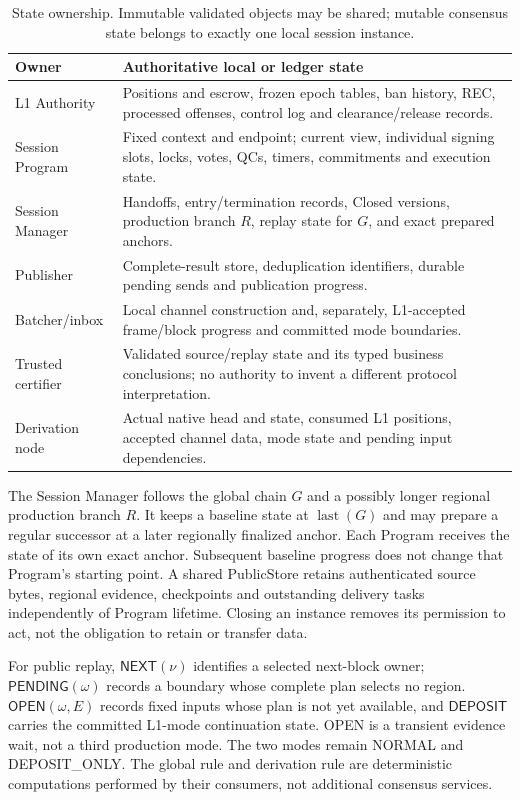 \begin{table}[htbp]
\centering\small
\caption{State ownership. Immutable validated objects may be shared;
mutable consensus state belongs to exactly one local session instance.}
\label{tab:state-ownership}
\begin{tabularx}{\linewidth}{@{}P{.21\linewidth}Y@{}}
\toprule
Owner & Authoritative local or ledger state\\\midrule
L1 Authority & Positions and escrow, frozen epoch tables, ban history,
REC, processed offenses, control log and clearance/release records.\\
Session Program & Fixed context and endpoint; current view, individual
signing slots, locks, votes, QCs, timers, commitments and execution state.\\
Session Manager & Handoffs, entry/termination records, Closed versions,
production branch $R$, replay state for $G$, and exact prepared anchors.\\
Publisher & Complete-result store, deduplication identifiers, durable
pending sends and publication progress.\\
Batcher/inbox & Local channel construction and, separately, L1-accepted
frame/block progress and committed mode boundaries.\\
Trusted certifier & Validated source/replay state and its typed business
conclusions; no authority to invent a different protocol interpretation.\\
Derivation node & Actual native head and state, consumed L1 positions,
accepted channel data, mode state and pending input dependencies.\\
\bottomrule
\end{tabularx}
\end{table}
The Session Manager follows the global chain $G$ and a possibly longer
regional production branch $R$. It keeps a baseline state at
$\operatorname{last}(G)$ and may prepare a regular successor at a later
regionally finalized anchor. Each Program receives the state of its
own exact anchor. Subsequent baseline progress does not change that
Program's starting point. A shared PublicStore retains authenticated
source bytes, regional evidence, checkpoints and outstanding delivery
tasks independently of Program lifetime. Closing an instance removes
its permission to act, not the obligation to retain or transfer data.

For public replay, $\mathsf{NEXT}(\nu)$ identifies a selected next-block
owner; $\mathsf{PENDING}(\omega)$ records a boundary whose complete plan
selects no region. $\mathsf{OPEN}(\omega,E)$ records fixed inputs whose
plan is not yet available, and $\mathsf{DEPOSIT}$ carries the committed
L1-mode continuation state. OPEN is a transient evidence wait, not a
third production mode. The two modes remain NORMAL and DEPOSIT\_ONLY.
The global rule and derivation rule are deterministic computations
performed by their consumers, not additional consensus services.

